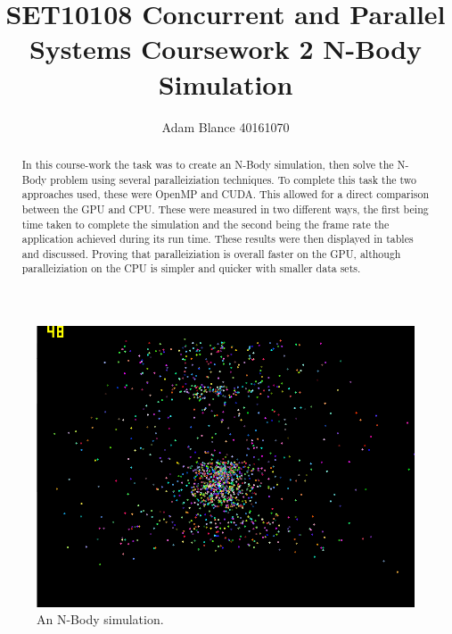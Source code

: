 \documentclass[12pt]{article}
\author{Adam Blance 40161070}
\begin{document}
	\title{SET10108 Concurrent and Parallel Systems \linebreak Coursework 2 \linebreak N-Body Simulation}
	\maketitle
	\newpage
\begin{abstract}
In this course-work the task was to create an N-Body simulation, then solve the N-Body problem using several paralleiziation techniques. To complete this task the two approaches used, these were OpenMP and CUDA. This allowed for a direct comparison between the GPU and CPU. These were measured in two different ways, the first being time taken to complete the simulation and the second being the frame rate the application achieved during its run time. These results were then displayed in tables and discussed. Proving that paralleiziation is overall faster on the GPU, although paralleiziation on the CPU is simpler and quicker with smaller data sets.
\newline
\end{abstract}
\begin{figure}[h]
	\centering
	\includegraphics[scale=0.5]{pics/intro.png}
	\caption{An N-Body simulation.}
\end{figure}
\newpage	
	
\end{document}
